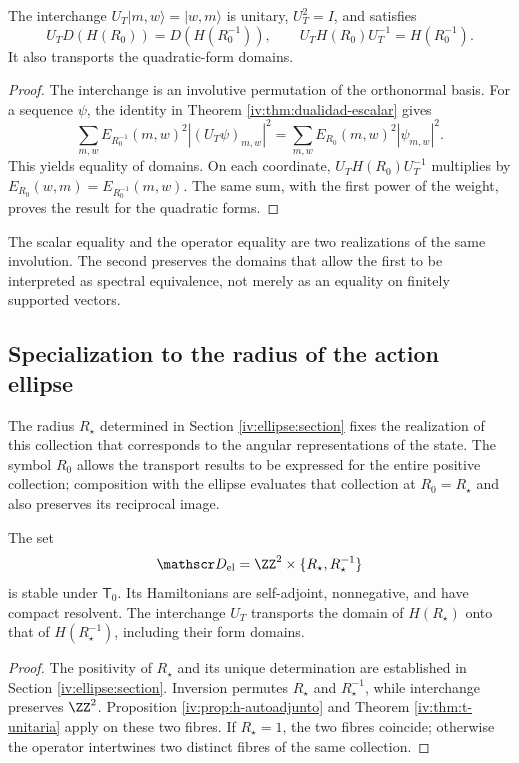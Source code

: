 \begin{theorem}
\label{iv:thm:t-unitaria}
\label{prop:dualidad-radios-k}
The interchange
\(U_T|m,w\rangle=|w,m\rangle\) is unitary,
\(U_T^2=I\), and satisfies
\begin{equation}
 U_TD(H(R_0))=D(H(R_0^{-1})),
 \qquad U_TH(R_0)U_T^{-1}=H(R_0^{-1}).
 \label{iv:eq:conjugacion-h}
\end{equation}
It also transports the quadratic-form domains.
\end{theorem}
\begin{proof}
The interchange is an involutive permutation of the
orthonormal basis. For a sequence \(\psi\), the identity in
Theorem \ref{iv:thm:dualidad-escalar} gives
\[
 \sum_{m,w}E_{R_0^{-1}}(m,w)^2|(U_T\psi)_{m,w}|^2
 =\sum_{m,w}E_{R_0}(m,w)^2|\psi_{m,w}|^2.
\]
This yields equality of domains. On each coordinate,
\(U_TH(R_0)U_T^{-1}\) multiplies by
\(E_{R_0}(w,m)=E_{R_0^{-1}}(m,w)\). The same sum, with
the first power of the weight, proves the result for the
quadratic forms.
\end{proof}

The scalar equality and the operator equality are two realizations
of the same involution. The second preserves the domains that
allow the first to be interpreted as spectral equivalence,
not merely as an equality on finitely supported vectors.

\subsection{Specialization to the radius of the action ellipse}

The radius \(R_\star\) determined in Section
\ref{iv:ellipse:section} fixes the realization of this collection that
corresponds to the angular representations of the state. The symbol
\(R_0\) allows the transport results to be expressed for the entire
positive collection; composition with the ellipse evaluates that collection at
\(R_0=R_\star\) and also preserves its reciprocal image.

\begin{corollary}
\label{iv:cor:radio-especializado}
The set
\[
 \mathscr D_{\mathrm{el}}
 =\ZZ^2\times\{R_\star,R_\star^{-1}\}
\]
is stable under \(\mathsf T_0\). Its Hamiltonians are self-adjoint,
nonnegative, and have compact resolvent. The interchange \(U_T\)
transports the domain of \(H(R_\star)\) onto that of
\(H(R_\star^{-1})\), including their form domains.
\end{corollary}
\begin{proof}
The positivity of \(R_\star\) and its unique determination are established
in Section \ref{iv:ellipse:section}. Inversion permutes
\(R_\star\) and \(R_\star^{-1}\), while interchange preserves
\(\ZZ^2\). Proposition
\ref{iv:prop:h-autoadjunto} and Theorem \ref{iv:thm:t-unitaria}
apply on these two fibres.
If \(R_\star=1\), the two fibres coincide; otherwise
the operator intertwines two distinct fibres of the same collection.
\end{proof}

